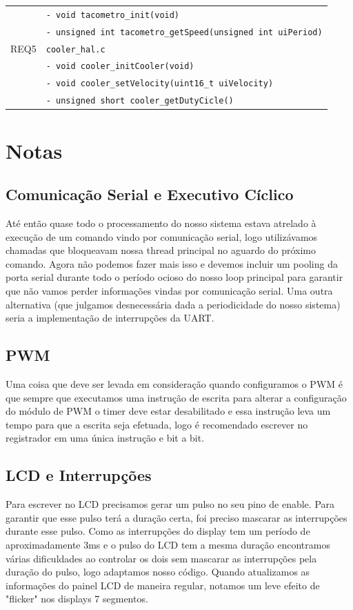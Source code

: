 \documentclass{article}
\begin{document}
\begin{table}[H]
{\begin{tabular}{|c|l|}
						& \texttt{- void tacometro\_init(void)}\\ 
						& \texttt{- unsigned int tacometro\_getSpeed(unsigned int uiPeriod)}\\
		\hline REQ5
						& \texttt{cooler\_hal.c}\\
						& \texttt{- void cooler\_initCooler(void)}\\
						& \texttt{- void cooler\_setVelocity(uint16\_t uiVelocity)}\\
						& \texttt{- unsigned short cooler\_getDutyCicle()}\\
		\hline 
	\end{tabular}
	} 
	\normalsize
\end{table}
\section{Notas}
\subsection{Comunicação Serial e Executivo Cíclico}
Até então quase todo o processamento do nosso sistema estava atrelado à execução de um comando vindo por comunicação serial, logo utilizávamos chamadas que bloqueavam nossa thread principal no aguardo do próximo comando. Agora não podemos fazer mais isso e devemos incluir um pooling da porta serial durante todo o período ocioso do nosso loop principal para garantir que não vamos perder informações vindas por comunicação serial. Uma outra alternativa (que julgamos desnecessária dada a periodicidade do nosso sistema) seria a implementação de interrupções da UART.

\subsection{PWM}
Uma coisa que deve ser levada em consideração quando configuramos o PWM é que sempre que executamos uma instrução de escrita para alterar a configuração do módulo de PWM o timer deve estar desabilitado e essa instrução leva um tempo para que a escrita seja efetuada, logo é recomendado escrever no registrador em uma única instrução e bit a bit. 

\subsection{LCD e Interrupções}
Para escrever no LCD precisamos gerar um pulso no seu pino de enable. Para garantir que esse pulso terá a duração certa, foi preciso mascarar as interrupções durante esse pulso. Como as interrupções do display tem um período de aproximadamente 3ms e o pulso do LCD tem a mesma duração encontramos várias dificuldades ao controlar os dois sem mascarar as interrupções pela duração do pulso, logo adaptamos nosso código. Quando atualizamos as informações do painel LCD de maneira regular, notamos um leve efeito de "flicker" nos displays 7 segmentos.
\end{document}
